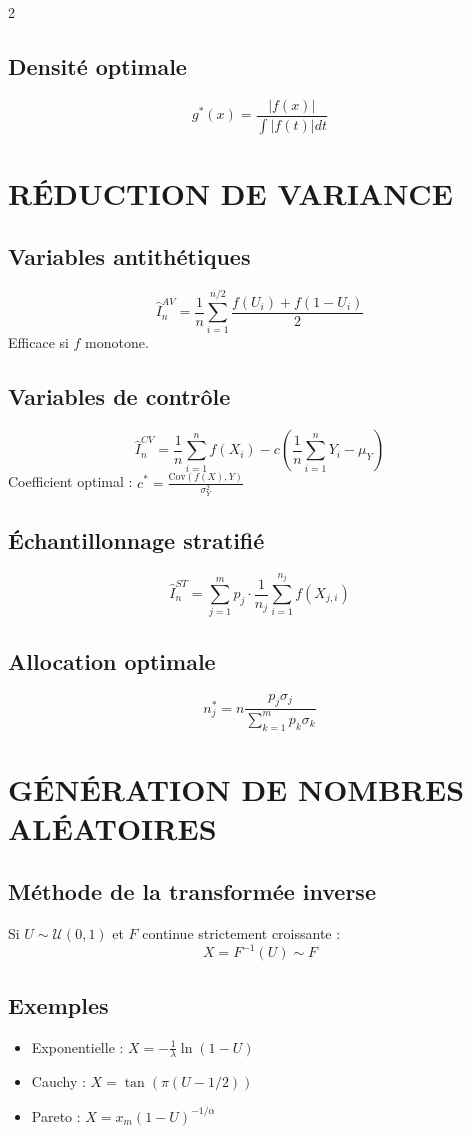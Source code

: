 \documentclass[10pt,a4paper]{article}
\begin{document}
\begin{multicols}{2}
\subsection*{Densité optimale}
\[
g^*(x) = \frac{|f(x)|}{\int |f(t)| dt}
\]

\section*{RÉDUCTION DE VARIANCE}

\subsection*{Variables antithétiques}
\[
\hat{I}_n^{AV} = \frac{1}{n} \sum_{i=1}^{n/2} \frac{f(U_i) + f(1-U_i)}{2}
\]
Efficace si $f$ monotone.

\subsection*{Variables de contrôle}
\[
\hat{I}_n^{CV} = \frac{1}{n} \sum_{i=1}^n f(X_i) - c \left(\frac{1}{n} \sum_{i=1}^n Y_i - \mu_Y\right)
\]
Coefficient optimal : $c^* = \frac{\text{Cov}(f(X), Y)}{\sigma_Y^2}$

\subsection*{Échantillonnage stratifié}
\[
\hat{I}_n^{ST} = \sum_{j=1}^m p_j \cdot \frac{1}{n_j} \sum_{i=1}^{n_j} f(X_{j,i})
\]

\subsection*{Allocation optimale}
\[
n_j^* = n \frac{p_j \sigma_j}{\sum_{k=1}^m p_k \sigma_k}
\]

\section*{GÉNÉRATION DE NOMBRES ALÉATOIRES}

\subsection*{Méthode de la transformée inverse}
Si $U \sim \mathcal{U}(0,1)$ et $F$ continue strictement croissante :
\[
X = F^{-1}(U) \sim F
\]

\subsection*{Exemples}
\begin{itemize}
    \item Exponentielle : $X = -\frac{1}{\lambda} \ln(1-U)$
    \item Cauchy : $X = \tan(\pi(U - 1/2))$
    \item Pareto : $X = x_m (1-U)^{-1/\alpha}$
\end{itemize}


\end{multicols}
\end{document}
